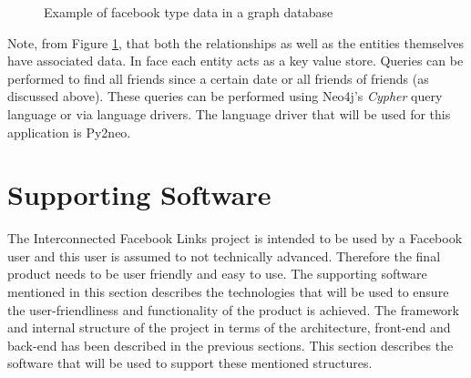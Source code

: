 \documentclass[10pt,onecolumn]{article}
\begin{document}
\begin{figure}[htbp]
    \centering
    \caption{Example of facebook type data in a graph database}
    \label{friends}
\end{figure}
Note, from Figure \ref{friends}, that both the relationships as well as the entities themselves have associated data. In face each entity acts as a key value store. Queries can be performed to find all friends since a certain date or all friends of friends (as discussed above). These queries can be performed using Neo4j's \emph{Cypher} query language or via language drivers. The language driver that will be used for this application is Py2neo.

\section{Supporting Software}
The Interconnected Facebook Links project is intended to be used by a Facebook user and this user is assumed to not technically advanced. Therefore the final product needs to be user friendly and easy to use. The supporting software mentioned in this section describes the technologies that will be used to ensure the user-friendliness and functionality of the product is achieved. The framework and internal structure  of the project in terms of the architecture, front-end and back-end has been described in the previous sections. This section describes the software that will be used to support these mentioned structures.
\end{document}
